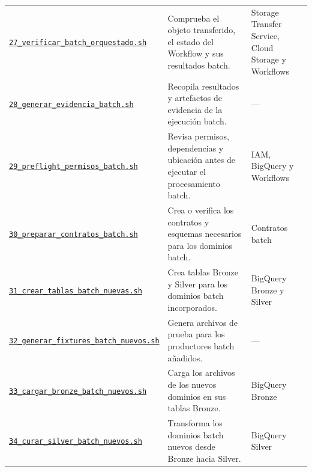\documentclass[11pt]{article}
\begin{document}
\begin{longtable}{@{}>{\raggedright\arraybackslash}p{}>{\raggedright\arraybackslash}p{}>{\raggedright\arraybackslash}p{}@{}}
\href{https://github.com/Codenid/lumina-retail-data-platform/blob/main/implementation/automatizacion/scripts27_verificar_batch_orquestado.sh}{\texttt{27\_\allowbreak{}verificar\_\allowbreak{}batch\_\allowbreak{}orquestado.sh}} & Comprueba el objeto transferido, el estado del Workflow y sus resultados batch. & Storage Transfer Service, Cloud Storage y Workflows \\
\href{https://github.com/Codenid/lumina-retail-data-platform/blob/main/implementation/automatizacion/scripts28_generar_evidencia_batch.sh}{\texttt{28\_\allowbreak{}generar\_\allowbreak{}evidencia\_\allowbreak{}batch.sh}} & Recopila resultados y artefactos de evidencia de la ejecución batch. & — \\
\href{https://github.com/Codenid/lumina-retail-data-platform/blob/main/implementation/automatizacion/scripts29_preflight_permisos_batch.sh}{\texttt{29\_\allowbreak{}preflight\_\allowbreak{}permisos\_\allowbreak{}batch.sh}} & Revisa permisos, dependencias y ubicación antes de ejecutar el procesamiento batch. & IAM, BigQuery y Workflows \\
\href{https://github.com/Codenid/lumina-retail-data-platform/blob/main/implementation/automatizacion/scripts30_preparar_contratos_batch.sh}{\texttt{30\_\allowbreak{}preparar\_\allowbreak{}contratos\_\allowbreak{}batch.sh}} & Crea o verifica los contratos y esquemas necesarios para los dominios batch. & Contratos batch \\
\href{https://github.com/Codenid/lumina-retail-data-platform/blob/main/implementation/automatizacion/scripts31_crear_tablas_batch_nuevas.sh}{\texttt{31\_\allowbreak{}crear\_\allowbreak{}tablas\_\allowbreak{}batch\_\allowbreak{}nuevas.sh}} & Crea tablas Bronze y Silver para los dominios batch incorporados. & BigQuery Bronze y Silver \\
\href{https://github.com/Codenid/lumina-retail-data-platform/blob/main/implementation/automatizacion/scripts32_generar_fixtures_batch_nuevos.sh}{\texttt{32\_\allowbreak{}generar\_\allowbreak{}fixtures\_\allowbreak{}batch\_\allowbreak{}nuevos.sh}} & Genera archivos de prueba para los productores batch añadidos. & — \\
\href{https://github.com/Codenid/lumina-retail-data-platform/blob/main/implementation/automatizacion/scripts33_cargar_bronze_batch_nuevos.sh}{\texttt{33\_\allowbreak{}cargar\_\allowbreak{}bronze\_\allowbreak{}batch\_\allowbreak{}nuevos.sh}} & Carga los archivos de los nuevos dominios en sus tablas Bronze. & BigQuery Bronze \\
\href{https://github.com/Codenid/lumina-retail-data-platform/blob/main/implementation/automatizacion/scripts34_curar_silver_batch_nuevos.sh}{\texttt{34\_\allowbreak{}curar\_\allowbreak{}silver\_\allowbreak{}batch\_\allowbreak{}nuevos.sh}} & Transforma los dominios batch nuevos desde Bronze hacia Silver. & BigQuery Silver \\

\end{longtable}
\end{document}

